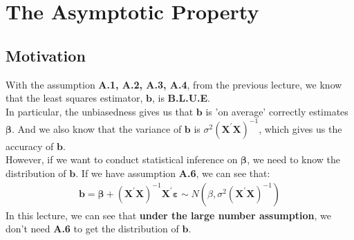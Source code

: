 \documentclass{article}
\begin{document}
\newpage
\section{The Asymptotic Property}
\subsection{Motivation}
With the assumption \textbf{A.1, A.2, A.3, A.4}, from the previous lecture, we know that the least squares estimator, $\boldsymbol{b}$, is \textbf{B.L.U.E}.\\
In particular, the unbiasedness gives us that $\boldsymbol{b}$ is 'on average' correctly estimates $\boldsymbol{\beta}$. And we also know that the variance of $\boldsymbol{b}$ is $\sigma^2 (\boldsymbol{X}^\prime \boldsymbol{X})^{-1}$, which gives us the accuracy of $\boldsymbol{b}$.\\
However, if we want to conduct statistical inference on $\boldsymbol{\beta}$, we need to know the distribution of $\boldsymbol{b}$. If we have assumption \textbf{A.6}, we can see that:
	\begin{align*}
		\boldsymbol{b} = \boldsymbol{\beta} + (\boldsymbol{X}^\prime \boldsymbol{X})^{-1} \boldsymbol{X}^\prime \boldsymbol{\varepsilon} \sim N(\beta, \sigma^2 (\boldsymbol{X}^\prime \boldsymbol{X})^{-1})
	\end{align*}
In this lecture, we can see that \textbf{under the large number assumption}, we don't need \textbf{A.6} to get the distribution of $\boldsymbol{b}$.
\end{document}
